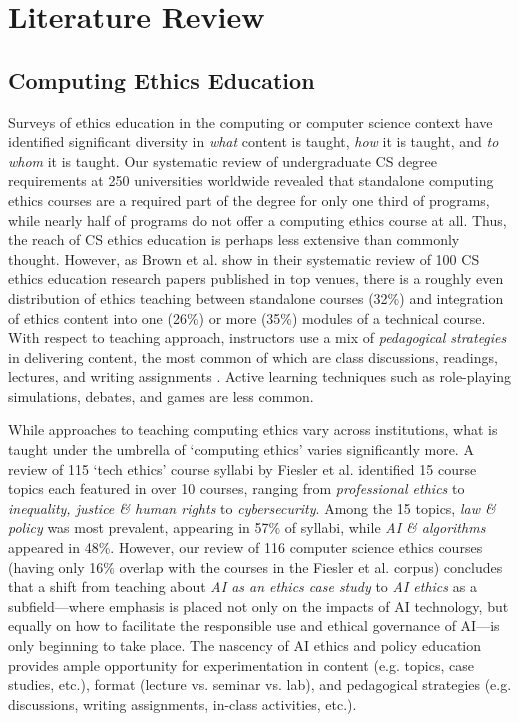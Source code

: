 \section{Literature Review}
\subsection*{Computing Ethics Education}

Surveys of ethics education in the computing or computer science context have identified significant diversity in \textit{what} content is taught, \textit{how} it is taught, and \textit{to whom} it is taught. Our systematic review \cite{weichert_i_2025} of undergraduate CS degree requirements at 250 universities worldwide revealed that standalone computing ethics courses are a required part of the degree for only one third of programs, while nearly half of programs do not offer a computing ethics course at all. Thus, the reach of CS ethics education is perhaps less extensive than commonly thought. However, as Brown et al. \cite{brown_teaching_2024} show in their systematic review of 100 CS ethics education research papers published in top venues, there is a roughly even distribution of ethics teaching between standalone courses (32\%) and integration of ethics content into one (26\%) or more (35\%) modules of a technical course. With respect to teaching approach, instructors use a mix of \textit{pedagogical strategies} in delivering content, the most common of which are class discussions, readings, lectures, and writing assignments \cite{brown_teaching_2024}. Active learning techniques such as role-playing simulations, debates, and games are less common.

While approaches to teaching computing ethics vary across institutions, what is taught under the umbrella of `computing ethics' varies significantly more. A review of 115 `tech ethics' course syllabi by Fiesler et al. \cite{fiesler_what_2020} identified 15 course topics each featured in over 10 courses, ranging from \textit{professional ethics} to \textit{inequality, justice \& human rights} to \textit{cybersecurity}. Among the 15 topics, \textit{law \& policy} was most prevalent, appearing in 57\% of syllabi, while \textit{AI \& algorithms} appeared in 48\%. However, our review \cite{weichert_eval} of 116 computer science ethics courses (having only 16\% overlap with the courses in the Fiesler et al. corpus) concludes that a shift from teaching about \textit{AI as an ethics case study} to \textit{AI ethics} as a subfield—where emphasis is placed not only on the impacts of AI technology, but equally on how to facilitate the responsible use and ethical governance of AI—is only beginning to take place. The nascency of AI ethics and policy education provides ample opportunity for experimentation in content (e.g. topics, case studies, etc.), format (lecture vs. seminar vs. lab), and pedagogical strategies (e.g. discussions, writing assignments, in-class activities, etc.).

